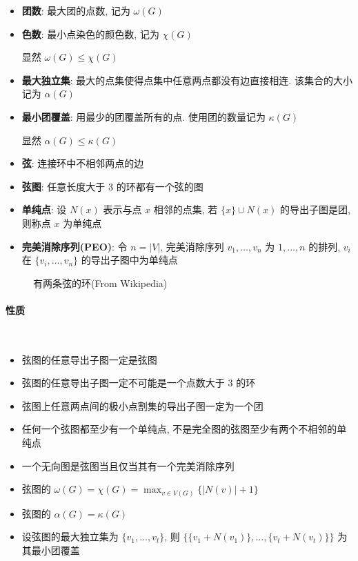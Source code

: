 \begin{itemize}
    \item \textbf{团数}: 最大团的点数, 记为 \(\omega(G)\)
    \item \textbf{色数}: 最小点染色的颜色数, 记为 \(\chi(G)\)

          显然 \(\omega(G)\le\chi(G)\)

    \item \textbf{最大独立集}: 最大的点集使得点集中任意两点都没有边直接相连. 该集合的大小记为 \(\alpha(G)\)
    \item \textbf{最小团覆盖}: 用最少的团覆盖所有的点. 使用团的数量记为 \(\kappa(G)\)

          显然 \(\alpha(G)\le\kappa(G)\)

    \item \textbf{弦}: 连接环中不相邻两点的边
    \item \textbf{弦图}: 任意长度大于 \(3\) 的环都有一个弦的图
    \item \textbf{单纯点}: 设 \(N(x)\) 表示与点 \(x\) 相邻的点集, 若 \(\{x\}\cup N(x)\) 的导出子图是团, 则称点 \(x\) 为单纯点
    \item \textbf{完美消除序列(PEO)}: 令 \(n=|V|\), 完美消除序列 \(v_1,\dots,v_n\) 为 \(1,\dots,n\) 的排列, \(v_i\) 在 \(\{v_i,\dots,v_n\}\) 的导出子图中为单纯点
\end{itemize}

\begin{figure}[h]
    \label{img:c5-with-2-chords}
    \centering
    
    \caption{有两条弦的环(From Wikipedia)}
\end{figure}

\paragraph{性质}~\\

\begin{itemize}
    \item 弦图的任意导出子图一定是弦图
    \item 弦图的任意导出子图一定不可能是一个点数大于 \(3\) 的环
    \item 弦图上任意两点间的极小点割集的导出子图一定为一个团
    \item 任何一个弦图都至少有一个单纯点, 不是完全图的弦图至少有两个不相邻的单纯点
    \item 一个无向图是弦图当且仅当其有一个完美消除序列
    \item 弦图的 \(\omega(G)=\chi(G)=\max_{v\in V(G)}\{|N(v)|+1\}\)
    \item 弦图的 \(\alpha(G)=\kappa(G)\)
    \item 设弦图的最大独立集为 \(\{v_1,\dots,v_t\}\), 则 \(\{\{v_1+N(v_1)\},\dots,\{v_t+N(v_t)\} \}\) 为其最小团覆盖
\end{itemize}

